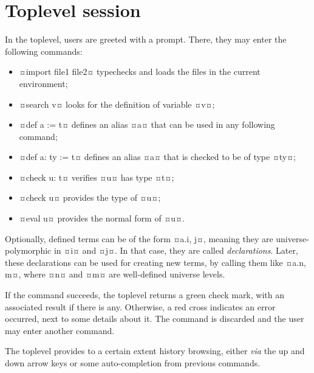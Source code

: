\documentclass[twocolumn]{article}
\begin{document}
\section{Toplevel session}
In the toplevel, users are greeted with a prompt. There, they may enter the
following commands:
\begin{itemize}
	\item ¤import file1 file2¤ typechecks
	      and loads the files in the current environment;
	\item ¤search v¤ looks for the definition of variable ¤v¤;
	\item ¤def a := t¤
	      defines an alias ¤a¤ that can be used in any following command;
	\item ¤def a: ty := t¤ defines an alias ¤a¤ that is checked to
	      be of type ¤ty¤;
	\item ¤check u: t¤ verifies ¤u¤ has type ¤t¤;
	\item ¤check u¤ provides the type of ¤u¤;
	\item ¤eval u¤ provides the normal form of ¤u¤.
\end{itemize}

Optionally, defined terms can be of the form ¤a.{i, j}¤, meaning they are
universe-polymorphic in ¤i¤ and ¤j¤. In that case, they are called
\emph{declarations}. Later, these declarations can be used for creating new
terms, by calling them like ¤a.{n, m}¤, where ¤n¤ and ¤m¤ are well-defined
universe levels.

If the command succeeds, the toplevel returns a green check mark, with an
associated result if there is any. Otherwise, a red cross indicates an error
occurred, next to some details about it. The command is discarded and the user
may enter another command.

The toplevel provides to a certain extent history browsing, either \emph{via}
the up and down arrow keys or some auto-completion from previous commands.
\end{document}
